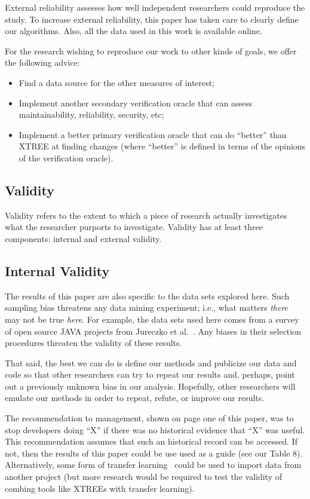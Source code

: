 \documentclass[twocolumn,5p]{elsarticle}
\newcommand{\bi}{\begin{itemize}[leftmargin=0.4cm]}
\newcommand{\ei}{\end{itemize}}
\theoremstyle{break}
\begin{document}
\begin{itemize}
External reliability assesses how well independent researchers
could reproduce the study. To increase external
reliability, this paper has taken care to clearly define our
algorithms. Also, all the data used in this work is available
online. 

For the research wishing to reproduce our work to other kinds of goals, we offer the following advice:

\bi
\item Find a data source for the other measures of interest;
\item Implement another secondary verification oracle that can assess maintainability, reliability, security, etc;
\item Implement a better primary verification oracle that can do ``better'' than XTREE at finding changes (where ``better'' is defined in terms 
of the opinions of the verification oracle).
\ei


\subsection{Validity}

Validity refers to the extent to which a piece of research actually
investigates what the researcher purports to investigate.
Validity has at least three components: internal and
external validity.

\subsection{Internal Validity}
The results of this paper are also specific to the data sets explored here.
Such sampling bias threatens any data mining experiment; i.e., what matters
{\em there} may not be true {\em here}. For example, the data sets used here comes from a survey of
open source JAVA projects from Jureczko et al.~\cite{jureczko10}. Any biases in their selection procedures
threaten the validity of these results. 

That said,
the best we can do is define our methods and publicize our data and code so that other researchers can
try to repeat our results and, perhaps, point out a previously unknown bias
in our analysis. Hopefully, other researchers will emulate our methods in
order to repeat, refute, or improve our results. 

The recommendation to management, shown on page one of this paper,  was to stop developers doing ``X'' if there was no historical evidence that ``X'' was useful. 
This recommendation assumes that such an  historical record can be accessed. If not,  then the results of this paper could be use used as a guide (see our Table 8). Alternatively, some form of transfer learning~\cite{Nam15,Jing15,krishna16} could be used to import data from another project (but more research would be required to test the validity of combing tools like XTREEs with transfer learning). 


\end{itemize}
\end{document}
